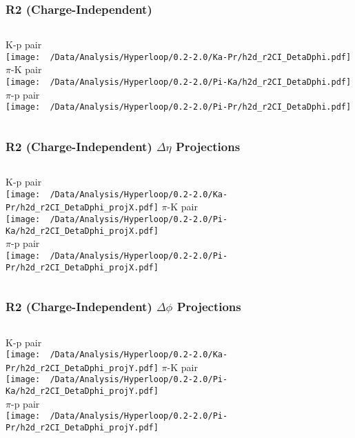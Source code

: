 \documentclass{beamer}
\begin{document}
\begin{frame}
	\frametitle{R2 (Charge-Independent)}
	\begin{columns}
		\centering
		K-p pair\\
		\texttt{[image: ~/Data/Analysis/Hyperloop/0.2-2.0/Ka-Pr/h2d\_r2CI\_DetaDphi.pdf]}
		\centering
		$\pi$-K pair\\
		\texttt{[image: ~/Data/Analysis/Hyperloop/0.2-2.0/Pi-Ka/h2d\_r2CI\_DetaDphi.pdf]}\\$\pi$-p pair\\
		\texttt{[image: ~/Data/Analysis/Hyperloop/0.2-2.0/Pi-Pr/h2d\_r2CI\_DetaDphi.pdf]}
	\end{columns}
\end{frame}
\begin{frame}
	\frametitle{R2 (Charge-Independent) $\Delta\eta$ Projections}
	\begin{columns}
		\column{0.5\textwidth}
		\centering
		K-p pair\\
		\texttt{[image: ~/Data/Analysis/Hyperloop/0.2-2.0/Ka-Pr/h2d\_r2CI\_DetaDphi\_projX.pdf]}
		\column{0.5\textwidth}
		\centering
		$\pi$-K pair\\
		\texttt{[image: ~/Data/Analysis/Hyperloop/0.2-2.0/Pi-Ka/h2d\_r2CI\_DetaDphi\_projX.pdf]}\\$\pi$-p pair\\
		\texttt{[image: ~/Data/Analysis/Hyperloop/0.2-2.0/Pi-Pr/h2d\_r2CI\_DetaDphi\_projX.pdf]}
	\end{columns}
\end{frame}
\begin{frame}
	\frametitle{R2 (Charge-Independent) $\Delta\phi$ Projections}
	\begin{columns}
		\centering
		K-p pair\\
		\texttt{[image: ~/Data/Analysis/Hyperloop/0.2-2.0/Ka-Pr/h2d\_r2CI\_DetaDphi\_projY.pdf]}
		\centering
		$\pi$-K pair\\
		\texttt{[image: ~/Data/Analysis/Hyperloop/0.2-2.0/Pi-Ka/h2d\_r2CI\_DetaDphi\_projY.pdf]}\\$\pi$-p pair\\
		\texttt{[image: ~/Data/Analysis/Hyperloop/0.2-2.0/Pi-Pr/h2d\_r2CI\_DetaDphi\_projY.pdf]}
	\end{columns}
\end{frame}
\end{document}
